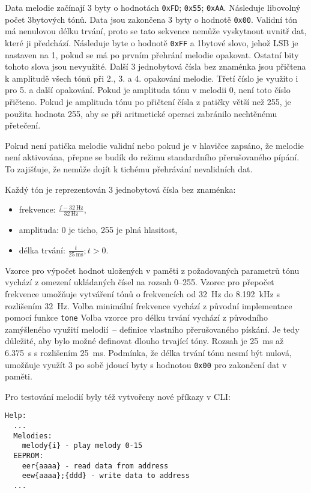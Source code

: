 Data melodie začínají 3 byty o hodnotách \texttt{0xFD}; \texttt{0x55};
\texttt{0xAA}. Následuje libovolný počet 3bytových tónů. Data jsou zakončena 3
byty o hodnotě \texttt{0x00}. Validní tón má nenulovou délku trvání, proto se
tato sekvence nemůže vyskytnout uvnitř dat, které ji předchází. Následuje byte
o hodnotě \texttt{0xFF} a 1bytové slovo, jehož LSB je nastaven na 1, pokud se
má po prvním přehrání melodie opakovat. Ostatní bity tohoto slova jsou
nevyužité. Další 3 jednobytová čísla bez znaménka jsou přičtena k amplitudě
všech tónů při 2., 3. a 4. opakování melodie. Třetí číslo je využito i pro 5.
a další opakování. Pokud je amplituda tónu v melodii 0, není toto číslo
přičteno. Pokud je amplituda tónu po přičtení čísla z patičky větší než
\num{255}, je použita hodnota \num{255}, aby se při aritmetické operaci
zabránilo nechtěnému přetečení.

Pokud není patička melodie validní nebo pokud je v hlavičce zapsáno, že melodie
není aktivována, přepne se budík do režimu standardního přerušovaného pípání.
To zajišťuje, že nemůže dojít k tichému přehrávání nevalidních dat.

Každý tón je reprezentován 3 jednobytová čísla bez znaménka:
\begin{itemize}[nosep]
    \item frekvence: $\frac{f - \SI{32}{\hertz}}{\SI{32}{\hertz}}$,
    \item amplituda: \num{0} je ticho, \num{255} je plná hlasitost,
    \item délka trvání: $\frac{t}{\SI{25}{\milli\second}}; t > 0$.
\end{itemize}

Vzorce pro výpočet hodnot uložených v paměti z požadovaných parametrů tónu
vychází z omezení ukládaných čísel na rozsah \numrange{0}{255}.
Vzorec pro přepočet frekvence umožňuje vytváření tónů o frekvencích od
\SI{32}{\hertz} do \SI{8,192}{\kilo\hertz} s rozlišením \SI{32}{\hertz}.
Volba minimální frekvence vychází z původní implementace pomocí funkce \verb|tone|
Volba vzorce pro délku trvání vychází z původního zamýšleného využití
melodií~-- definice vlastního přerušovaného pískání. Je tedy důležité, aby bylo
možné definovat dlouho trvající tóny. Rozsah je \SI{25}{\milli\second} až
\SI{6,375}{\second} s rozlišením \SI{25}{\milli\second}. Podmínka, že délka
trvání tónu nesmí být nulová, umožňuje využít 3 po sobě jdoucí byty s hodnotou
\texttt{0x00} pro zakončení dat v paměti.

Pro testování melodií byly též vytvořeny nové příkazy v CLI:
\begin{lstlisting}[style=terminal]
Help:
  ...
  Melodies:
    melody{i} - play melody 0-15
  EEPROM:
    eer{aaaa} - read data from address
    eew{aaaa};{ddd} - write data to address
  ...
\end{lstlisting}

